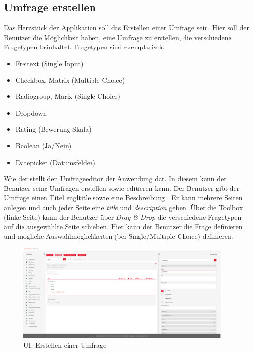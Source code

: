 
\subsection{Umfrage erstellen}
\label{ssec:UmfrageErstellen}

Das Herzstück der Applikation soll das Erstellen einer Umfrage sein. 
Hier soll der Benutzer die Möglichkeit haben, eine Umfrage zu erstellen, die verschiedene Fragetypen beinhaltet. 
Fragetypen sind exemplarisch: 
%
\begin{itemize}
	\item Freitext (Single Input)
	\item Checkbox, Matrix (Multiple Choice)
	\item Radiogroup, Marix (Single Choice)
	\item Dropdown 
	\item Rating (Bewerung Skala)
	\item Boolean (Ja/Nein)
	\item Datepicker (Datumsfelder)
\end{itemize}
%

Wie der \abb {} stellt den Umfrageeditor der Anwendung dar. In diesem kann der Benutzer seine Umfragen erstellen sowie editieren kann. 
Der Benutzer gibt der Umfrage einen Titel engl{title} sowie eine Beschreibung . 
Er kann mehrere Seiten anlegen und auch jeder Seite eine \emph{title} und \emph{description} geben. \newline
Über die Toolbox (linke Seite) kann der Benutzer über \emph{Drag \& Drop} die verschiedene Fragetypen auf die ausgewählte Seite schieben.  
Hier kann der Benutzer die Frage definieren und mögliche Auswahlmöglichkeiten (bei Single/Multiple Choice) definieren. 

\begin{figure}[hp]
	\centering
	\includegraphics[width=0.95\textwidth, keepaspectratio]{img/client/CreateSurveyMaster.png}
	\captionsetup{justification=centering, format=plain}
	\caption[\acf{UI}: Erstellen einer Umfrage]{\acf{UI}: Erstellen einer Umfrage \\ \quelleScreenshot}
	\label{fig:SurveyCreatorImplement}
\end{figure}

